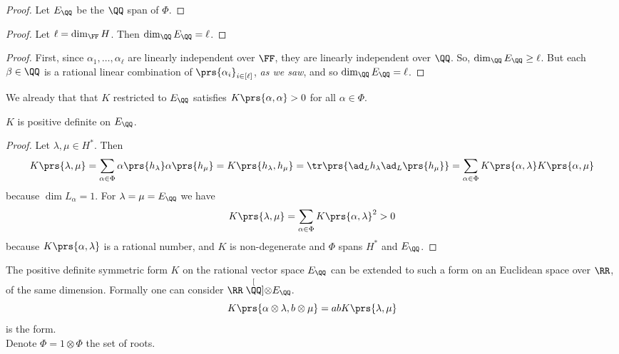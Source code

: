 \documentclass[10pt,a4paper,twoside,openany,hidelinks]{book}
\begin{document}
\begin{proof}
Let $E_{\QQ}$ be the $\QQ$ span of $\Phi$.
\end{proof}

\begin{proof}
Let $\ell = \dim_{\FF}H$. Then $\dim_{\QQ} E_{\QQ} = \ell$.
\end{proof}
\begin{proof}
First, since $\alpha_1, \ldots, \alpha_{\ell}$ are linearly independent over $\FF$, they are linearly independent over $\QQ$. So, $\dim_{\QQ}E_{\QQ} \geq \ell$. But each $\beta \in \QQ$ is a rational linear combination of $\prs{\alpha_i}_{i \in [\ell]}$, \emph{as we saw}, and so $\dim_{\QQ} E_{\QQ} = \ell$.
\end{proof}

\begin{remark}
We already that that $K$ restricted to $E_{\QQ}$ satisfies $K\prs{\alpha, \alpha} > 0$ for all $\alpha \in \Phi$.
\end{remark}

\begin{proposition}
$K$ is positive definite on $E_{\QQ}$.
\end{proposition}

\begin{proof}
Let $\lambda,\mu \in H^*$. Then
\[K\prs{\lambda,\mu} = \sum_{\alpha \in \Phi} \alpha \prs{h_{\lambda}} \alpha\prs{h_{\mu}} = K\prs{h_{\lambda}, h_{\mu}} = \tr \prs{\ad_L h_{\lambda} \ad_L \prs{h_{\mu}}} = \sum_{\alpha \in \Phi} K\prs{\alpha, \lambda} K\prs{\alpha, \mu}\]
because $\dim L_{\alpha} = 1$.
For $\lambda = \mu = E_{\QQ}$ we have
\[K\prs{\lambda,\mu} = \sum_{\alpha \in \Phi} K\prs{\alpha, \lambda}^2 > 0\]
because $K\prs{\alpha,\lambda}$ is a rational number, and $K$ is non-degenerate and $\Phi$ spans $H^*$ and $E_{\QQ}$.
\end{proof}

\begin{fact}
The positive definite symmetric form $K$ on the rational vector space $E_{\QQ}$ can be extended to such a form on an Euclidean space over $\RR$, of the same dimension. Formally one can consider $\RR \stackrel[\QQ]{}{\otimes} E_{\QQ}$.
\[K\prs{\alpha \otimes \lambda, b\otimes \mu} = abK\prs{\lambda,\mu}\] is the form.\\
Denote $\Phi = 1 \otimes \Phi$ the set of roots.
\end{fact}
\end{document}
